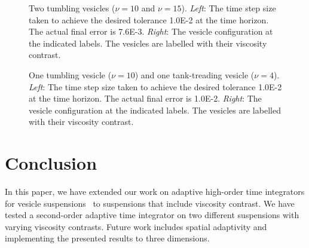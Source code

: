 \documentclass[3p,times,procedia]{elsarticle}
\newif\ifTikz
\begin{document}
\begin{figure}[htps]
\caption{\label{f:tumblingANDtumbling} Two tumbling vesicles ($\nu=10$
and $\nu=15$). {\em Left}: The time step size taken to achieve the
desired tolerance 1.0E-2 at the time horizon.  The actual final error
is 7.6E-3.  {\em Right}: The vesicle configuration at the indicated
labels.  The vesicles are labelled with their viscosity contrast.}
%
\begin{minipage}{.4\textwidth}
\ifTikz

\fi
\end{minipage}
\begin{minipage}{.58\textwidth}
\ifTikz
\begin{tabular}{c|c|c}
\scalebox{0.32}{} &
\scalebox{0.32}{} &
\scalebox{0.32}{} \\
\hline
\scalebox{0.32}{} &
\scalebox{0.32}{} &
\scalebox{0.32}{} \\
\hline
\scalebox{0.32}{} &
\scalebox{0.32}{} &
\scalebox{0.32}{} 
\end{tabular}
\fi
\end{minipage}
\caption{\label{f:treadingANDtumbling} One tumbling vesicle ($\nu=10$)
and one tank-treading vesicle ($\nu=4$).  {\em Left}: The time step
size taken to achieve the desired tolerance 1.0E-2 at the time
horizon.  The actual final error is 1.0E-2.  {\em Right}: The vesicle
configuration at the indicated labels.  The vesicles are labelled with
their viscosity contrast.}
\end{figure}


\section{Conclusion}
\label{s:Conclusion}
In this paper, we have extended our work on adaptive high-order time
integrators for vesicle suspensions~\cite{qua:bir2014c} to suspensions
that include viscosity contrast.  We have tested a second-order adaptive
time integrator on two different suspensions with varying viscosity
contrasts.  Future work includes spatial adaptivity and implementing the
presented results to three dimensions.
\end{document}

